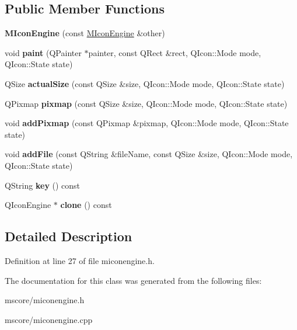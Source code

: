\subsection*{Public Member Functions}
\begin{DoxyCompactItemize}
\item 
\mbox{\label{class_m_icon_engine_abb89f3233cbffdaaf9643198c662fa0d}} 
{\bfseries M\+Icon\+Engine} (const \hyperlink{class_m_icon_engine}{M\+Icon\+Engine} \&other)
\item 
\mbox{\label{class_m_icon_engine_a11eb7d5dea9b1868f25511dce829783a}} 
void {\bfseries paint} (Q\+Painter $\ast$painter, const Q\+Rect \&rect, Q\+Icon\+::\+Mode mode, Q\+Icon\+::\+State state)
\item 
\mbox{\label{class_m_icon_engine_a505338062c084ce9f8d0210fa0f5fbb6}} 
Q\+Size {\bfseries actual\+Size} (const Q\+Size \&size, Q\+Icon\+::\+Mode mode, Q\+Icon\+::\+State state)
\item 
\mbox{\label{class_m_icon_engine_a3b190901f09af7adace5fb11e5af3299}} 
Q\+Pixmap {\bfseries pixmap} (const Q\+Size \&size, Q\+Icon\+::\+Mode mode, Q\+Icon\+::\+State state)
\item 
\mbox{\label{class_m_icon_engine_a053b4733ae4955fccdaa237db76433af}} 
void {\bfseries add\+Pixmap} (const Q\+Pixmap \&pixmap, Q\+Icon\+::\+Mode mode, Q\+Icon\+::\+State state)
\item 
\mbox{\label{class_m_icon_engine_ab3d844ce48a1fbddc1dd0e71dfe05c0f}} 
void {\bfseries add\+File} (const Q\+String \&file\+Name, const Q\+Size \&size, Q\+Icon\+::\+Mode mode, Q\+Icon\+::\+State state)
\item 
\mbox{\label{class_m_icon_engine_ae680d56ed6b17408b20bfb188fe2ca2e}} 
Q\+String {\bfseries key} () const
\item 
\mbox{\label{class_m_icon_engine_a817d32c6e44484ed33ba7d7f7d8ab3e9}} 
Q\+Icon\+Engine $\ast$ {\bfseries clone} () const
\end{DoxyCompactItemize}


\subsection{Detailed Description}


Definition at line 27 of file miconengine.\+h.



The documentation for this class was generated from the following files\+:\begin{DoxyCompactItemize}
\item 
mscore/miconengine.\+h\item 
mscore/miconengine.\+cpp\end{DoxyCompactItemize}
